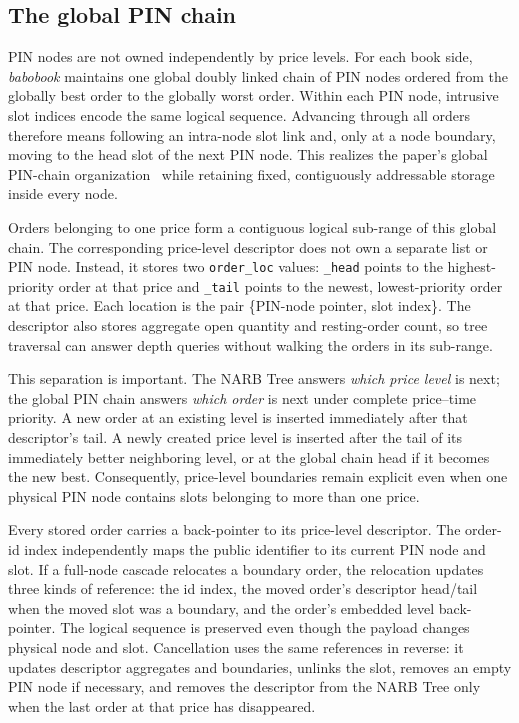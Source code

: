 \documentclass[10pt,twocolumn]{article}
\begin{document}
\subsection{The global PIN chain}

PIN nodes are not owned independently by price levels.  For each book side,
\textit{babobook} maintains one global doubly linked chain of PIN nodes ordered
from the globally best order to the globally worst order.  Within each PIN node,
intrusive slot indices encode the same logical sequence.  Advancing through all
orders therefore means following an intra-node slot link and, only at a node
boundary, moving to the head slot of the next PIN node.  This realizes the
paper's global PIN-chain organization~\cite{yoon2026} while retaining fixed,
contiguously addressable storage inside every node.

Orders belonging to one price form a contiguous logical sub-range of this global
chain.  The corresponding price-level descriptor does not own a separate list
or PIN node.  Instead, it stores two \texttt{order\_loc} values: \texttt{\_head}
points to the highest-priority order at that price and \texttt{\_tail} points to
the newest, lowest-priority order at that price.  Each location is the pair
\{PIN-node pointer, slot index\}.  The descriptor also stores aggregate open
quantity and resting-order count, so tree traversal can answer depth queries
without walking the orders in its sub-range.

This separation is important.  The NARB Tree answers \emph{which price level}
is next; the global PIN chain answers \emph{which order} is next under complete
price--time priority.  A new order at an existing level is inserted immediately
after that descriptor's tail.  A newly created price level is inserted after the
tail of its immediately better neighboring level, or at the global chain head if
it becomes the new best.  Consequently, price-level boundaries remain explicit
even when one physical PIN node contains slots belonging to more than one price.



Every stored order carries a back-pointer to its price-level descriptor.  The
order-id index independently maps the public identifier to its current PIN node
and slot.  If a full-node cascade relocates a boundary order, the relocation
updates three kinds of reference: the id index, the moved order's descriptor
head/tail when the moved slot was a boundary, and the order's embedded level
back-pointer.  The logical sequence is preserved even though the payload changes
physical node and slot.  Cancellation uses the same references in reverse: it
updates descriptor aggregates and boundaries, unlinks the slot, removes an empty
PIN node if necessary, and removes the descriptor from the NARB Tree only when
the last order at that price has disappeared.
\end{document}
